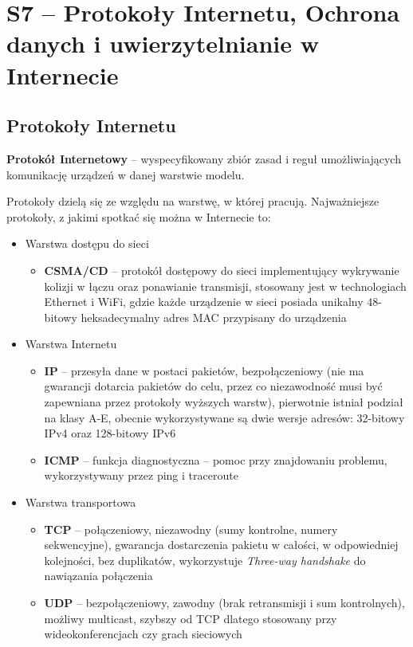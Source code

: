 \section{S7 -- Protokoły Internetu, Ochrona danych i uwierzytelnianie w Internecie}

\subsection{Protokoły Internetu}

\textbf{Protokół Internetowy} -- wyspecyfikowany zbiór zasad i reguł umożliwiających komunikację urządzeń w danej warstwie modelu.

Protokoły dzielą się ze względu na warstwę, w której pracują. Najważniejsze protokoły, z jakimi spotkać się można w Internecie to:

\begin{itemize}
	\item Warstwa dostępu do sieci
	\begin{itemize}
		\item \textbf{CSMA/CD} -- protokół dostępowy do sieci implementujący wykrywanie kolizji w łączu oraz ponawianie transmisji, stosowany jest w technologiach Ethernet i WiFi, gdzie każde urządzenie w sieci posiada unikalny 48-bitowy heksadecymalny adres MAC przypisany do urządzenia
	\end{itemize}
    
    \item Warstwa Internetu
    \begin{itemize}
		\item \textbf{IP} -- przesyła dane w postaci pakietów, bezpołączeniowy (nie ma gwarancji dotarcia pakietów do celu, przez co niezawodność musi być zapewniana przez protokoły wyższych warstw), pierwotnie istniał podział na klasy A-E, obecnie wykorzystywane są dwie wersje adresów: 32-bitowy IPv4 oraz 128-bitowy IPv6
        \item \textbf{ICMP} -- funkcja diagnostyczna -- pomoc przy znajdowaniu problemu, wykorzystywany przez ping i traceroute
	\end{itemize}
    
    \item Warstwa transportowa
    \begin{itemize}
		\item \textbf{TCP} -- połączeniowy, niezawodny (sumy kontrolne, numery sekwencyjne), gwarancja dostarczenia pakietu w całości, w odpowiedniej kolejności, bez duplikatów, wykorzystuje \textit{Three-way handshake} do nawiązania połączenia
		\item \textbf{UDP} -- bezpołączeniowy, zawodny (brak retransmisji i sum kontrolnych), możliwy multicast, szybszy od TCP dlatego stosowany przy wideokonferencjach czy grach sieciowych
	\end{itemize}
    

\end{itemize}
